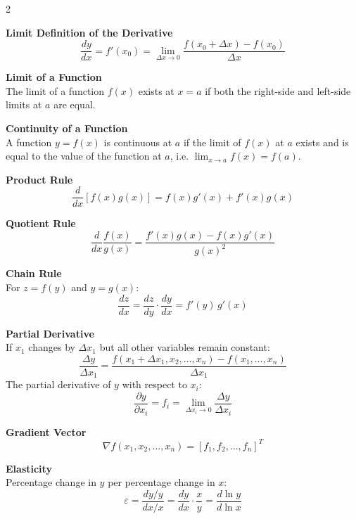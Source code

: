 \documentclass{./../../latex/tests}
\begin{document}
\thispagestyle{plain}
\vspace{-1.2em}
\small
\setlength{\parskip}{1.6mm}
\setlength{\abovedisplayskip}{4pt}
\setlength{\belowdisplayskip}{4pt}
\setlength{\abovedisplayshortskip}{3pt}
\setlength{\belowdisplayshortskip}{3pt}
\setlength{\columnsep}{9mm}

\begin{multicols}{2}

\textbf{Limit Definition of the Derivative}
\[ \frac{dy}{dx} = f'(x_0) = \lim_{\Delta x \rightarrow 0} \frac{f\left(x_{0}+\Delta x\right)-f\left(x_{0}\right)}{\Delta x} \]

\textbf{Limit of a Function}\\
The limit of a function $f(x)$ exists at $x = a$ if both the right-side and left-side limits at $a$ are equal.

\textbf{Continuity of a Function}\\
A function $y = f(x)$ is continuous at $a$ if the limit of $f(x)$ at $a$ exists and is equal to the value of the function at $a$, i.e. $\lim_{x \rightarrow a} f(x) = f(a)$.

\textbf{Product Rule}
\[ \frac{d}{dx}[f(x) g(x)] = f(x) g'(x) + f'(x) g(x) \]

\textbf{Quotient Rule}
\[ \frac{d}{dx} \frac{f(x)}{g(x)} = \frac{f'(x) g(x) - f(x) g'(x)}{g(x)^2} \]

\textbf{Chain Rule}\\
For $z = f(y)$ and $y = g(x)$:
\[ \frac{dz}{dx} = \frac{dz}{dy} \cdot \frac{dy}{dx} = f'(y)\, g'(x) \]

\textbf{Partial Derivative}\\
If $x_1$ changes by $\Delta x_1$ but all other variables remain constant:
\[ \frac{\Delta y}{\Delta x_{1}} = \frac{f\left(x_{1}+\Delta x_1, x_{2}, \ldots, x_{n}\right)-f\left(x_{1}, \ldots, x_{n}\right)}{\Delta x_{1}} \]
The partial derivative of $y$ with respect to $x_i$:
\[ \frac{\partial y}{\partial x_{i}} = f_i = \lim_{\Delta x_{i} \rightarrow 0} \frac{\Delta y}{\Delta x_{i}} \]

\textbf{Gradient Vector}
\[ \nabla f(x_1, x_2, \ldots, x_n) = [f_1, f_2, \ldots, f_n]^T \]

\columnbreak

\textbf{Elasticity}\\
Percentage change in $y$ per percentage change in $x$:
\[ \varepsilon = \frac{dy/y}{dx/x} = \frac{dy}{dx} \cdot \frac{x}{y} = \frac{d \ln y}{d \ln x} \]


\end{multicols}
\end{document}
